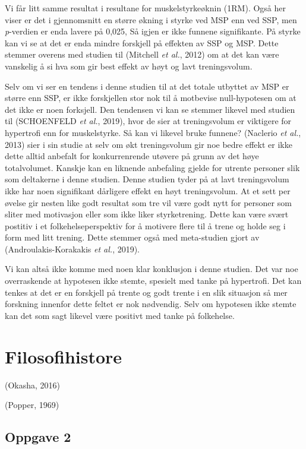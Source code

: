 \documentclass[
  letterpaper,
  DIV=11,
  numbers=noendperiod]{scrreprt}
\begin{document}
Vi får litt samme resultat i resultane for muskelstyrkeøknin (1RM). Også
her viser er det i gjennomsnitt en større økning i styrke ved MSP enn
ved SSP, men \emph{p}-verdien er enda lavere på 0,025, Så igjen er ikke
funnene signifikante. På styrke kan vi se at det er enda mindre
forskjell på effekten av SSP og MSP. Dette stemmer overens med studien
til (Mitchell \emph{et al.}, 2012) om at det kan være vanskelig å si hva
som gir best effekt av høyt og lavt treningsvolum.

Selv om vi ser en tendens i denne studien til at det totale utbyttet av
MSP er større enn SSP, er ikke forskjellen stor nok til å motbevise
null-hypotesen om at det ikke er noen forksjell. Den tendensen vi kan se
stemmer likevel med studien til (SCHOENFELD \emph{et al.}, 2019), hvor
de sier at treningsvolum er viktigere for hypertrofi enn for
muskelstyrke. Så kan vi likevel bruke funnene? (Naclerio \emph{et al.},
2013) sier i sin studie at selv om økt treningsvolum gir noe bedre
effekt er ikke dette alltid anbefalt for konkurrenrende utøvere på grunn
av det høye totalvolumet. Kanskje kan en liknende anbefaling gjelde for
utrente personer slik som deltakerne i denne studien. Denne studien
tyder på at lavt treningsvolum ikke har noen signifikant dårligere
effekt en høyt treningsvolum. At et sett per øvelse gir nesten like godt
resultat som tre vil være godt nytt for personer som sliter med
motivasjon eller som ikke liker styrketrening. Dette kan være svært
postitiv i et folkehelseperspektiv for å motivere flere til å trene og
holde seg i form med litt trening. Dette stemmer også med meta-studien
gjort av (Androulakis-Korakakis \emph{et al.}, 2019).

Vi kan altså ikke komme med noen klar konklusjon i denne studien. Det
var noe overraskende at hypotesen ikke stemte, spesielt med tanke på
hypertrofi. Det kan tenkes at det er en forskjell på trente og godt
trente i en slik situasjon så mer forskning innenfor dette feltet er nok
nødvendig. Selv om hypotesen ikke stemte kan det som sagt likevel være
positivt med tanke på folkehelse.


\chapter{Filosofihistore}\label{filosofihistore}

(Okasha, 2016)

(Popper, 1969)

\section{Oppgave 2}\label{oppgave-2}
\end{document}
